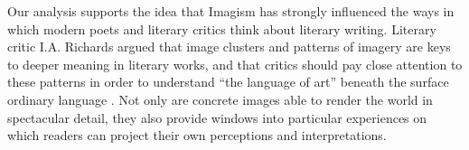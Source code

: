 \documentclass{book}
\begin{document}


Our analysis supports the idea that Imagism has strongly influenced the ways in which modern poets and literary critics think about literary writing. Literary critic I.A. Richards argued that image clusters and patterns of imagery are keys to deeper meaning in literary works, and that critics should pay close attention to these patterns in order to understand ``the language of art'' beneath the surface ordinary language \citep{critic}. Not only are concrete images able to render the world in spectacular detail, they also provide windows into particular experiences on which readers can project their own perceptions and interpretations.
\end{document}
